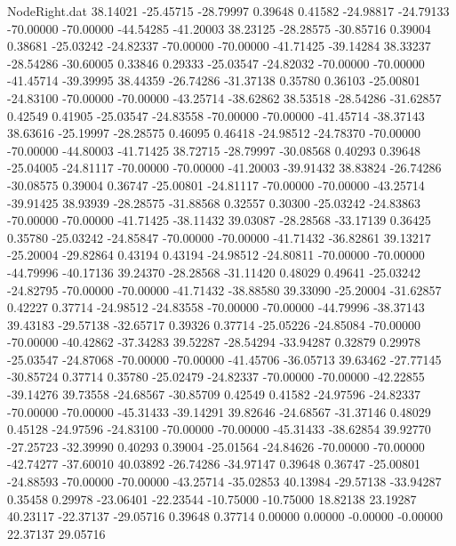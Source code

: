 \begin{filecontents}{NodeRight.dat}
  38.14021  -25.45715  -28.79997     0.39648    0.41582  -24.98817  -24.79133  -70.00000  -70.00000  -44.54285  -41.20003
  38.23125  -28.28575  -30.85716     0.39004    0.38681  -25.03242  -24.82337  -70.00000  -70.00000  -41.71425  -39.14284
  38.33237  -28.54286  -30.60005     0.33846    0.29333  -25.03547  -24.82032  -70.00000  -70.00000  -41.45714  -39.39995
  38.44359  -26.74286  -31.37138     0.35780    0.36103  -25.00801  -24.83100  -70.00000  -70.00000  -43.25714  -38.62862
  38.53518  -28.54286  -31.62857     0.42549    0.41905  -25.03547  -24.83558  -70.00000  -70.00000  -41.45714  -38.37143
  38.63616  -25.19997  -28.28575     0.46095    0.46418  -24.98512  -24.78370  -70.00000  -70.00000  -44.80003  -41.71425
  38.72715  -28.79997  -30.08568     0.40293    0.39648  -25.04005  -24.81117  -70.00000  -70.00000  -41.20003  -39.91432
  38.83824  -26.74286  -30.08575     0.39004    0.36747  -25.00801  -24.81117  -70.00000  -70.00000  -43.25714  -39.91425
  38.93939  -28.28575  -31.88568     0.32557    0.30300  -25.03242  -24.83863  -70.00000  -70.00000  -41.71425  -38.11432
  39.03087  -28.28568  -33.17139     0.36425    0.35780  -25.03242  -24.85847  -70.00000  -70.00000  -41.71432  -36.82861
  39.13217  -25.20004  -29.82864     0.43194    0.43194  -24.98512  -24.80811  -70.00000  -70.00000  -44.79996  -40.17136
  39.24370  -28.28568  -31.11420     0.48029    0.49641  -25.03242  -24.82795  -70.00000  -70.00000  -41.71432  -38.88580
  39.33090  -25.20004  -31.62857     0.42227    0.37714  -24.98512  -24.83558  -70.00000  -70.00000  -44.79996  -38.37143
  39.43183  -29.57138  -32.65717     0.39326    0.37714  -25.05226  -24.85084  -70.00000  -70.00000  -40.42862  -37.34283
  39.52287  -28.54294  -33.94287     0.32879    0.29978  -25.03547  -24.87068  -70.00000  -70.00000  -41.45706  -36.05713
  39.63462  -27.77145  -30.85724     0.37714    0.35780  -25.02479  -24.82337  -70.00000  -70.00000  -42.22855  -39.14276
  39.73558  -24.68567  -30.85709     0.42549    0.41582  -24.97596  -24.82337  -70.00000  -70.00000  -45.31433  -39.14291
  39.82646  -24.68567  -31.37146     0.48029    0.45128  -24.97596  -24.83100  -70.00000  -70.00000  -45.31433  -38.62854
  39.92770  -27.25723  -32.39990     0.40293    0.39004  -25.01564  -24.84626  -70.00000  -70.00000  -42.74277  -37.60010
  40.03892  -26.74286  -34.97147     0.39648    0.36747  -25.00801  -24.88593  -70.00000  -70.00000  -43.25714  -35.02853
  40.13984  -29.57138  -33.94287     0.35458    0.29978  -23.06401  -22.23544  -10.75000  -10.75000   18.82138   23.19287
  40.23117  -22.37137  -29.05716     0.39648    0.37714    0.00000    0.00000   -0.00000   -0.00000   22.37137   29.05716

\end{filecontents}
